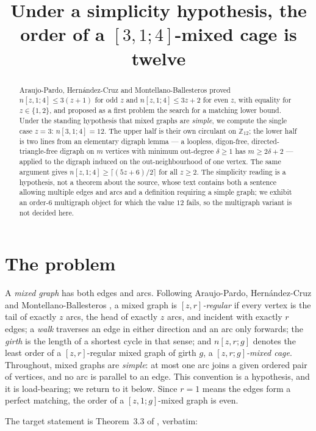 \documentclass[11pt]{amsart}
\title[{Order twelve under a simplicity hypothesis}]{Under a simplicity
hypothesis, the order of a $[3,1;4]$-mixed cage is twelve}
\date{}
\theoremstyle{remark}
\newcommand{\mn}[1]{n[#1]}
\begin{document}
\begin{abstract}
Araujo-Pardo, Hern\'andez-Cruz and Montellano-Ballesteros proved
$\mn{z,1;4}\le 3(z+1)$ for odd $z$ and $\mn{z,1;4}\le 3z+2$ for even $z$, with
equality for $z\in\{1,2\}$, and proposed as a first problem the search for a
matching lower bound. Under the standing hypothesis that mixed graphs are
\emph{simple}, we compute the single case $z=3$: $\mn{3,1;4}=12$. The upper half
is their own circulant on $\mathbb Z_{12}$; the lower half is two lines from an
elementary digraph lemma --- a loopless, digon-free, directed-triangle-free
digraph on $m$ vertices with minimum out-degree $\delta\ge1$ has $m\ge
2\delta+2$ --- applied to the digraph induced on the out-neighbourhood of one
vertex. The same argument gives $\mn{z,1;4}\ge\lceil(5z+6)/2\rceil$ for all
$z\ge2$. The simplicity reading is a hypothesis, not a theorem about the source,
whose text contains both a sentence allowing multiple edges and arcs and a
definition requiring a simple graph; we exhibit an order-$6$ multigraph object
for which the value $12$ fails, so the multigraph variant is not decided here.
\end{abstract}

\maketitle

\section{The problem}

A \emph{mixed graph} has both edges and arcs. Following Araujo-Pardo,
Hern\'andez-Cruz and Montellano-Ballesteros \cite{AHM}, a mixed graph is
\emph{$[z,r]$-regular} if every vertex is the tail of exactly $z$ arcs, the head
of exactly $z$ arcs, and incident with exactly $r$ edges; a \emph{walk}
traverses an edge in either direction and an arc only forwards; the \emph{girth}
is the length of a shortest cycle in that sense; and $\mn{z,r;g}$ denotes the
least order of a $[z,r]$-regular mixed graph of girth $g$, a \emph{$[z,r;g]$-mixed
cage}. Throughout, mixed graphs are \emph{simple}: at most one arc joins a given
ordered pair of vertices, and no arc is parallel to an edge. This convention is
a hypothesis, and it is load-bearing; we return to it below. Since $r=1$ means
the edges form a perfect matching, the order of a $[z,1;g]$-mixed graph is even.

The target statement is Theorem~3.3 of \cite{AHM}, verbatim:
\end{document}
